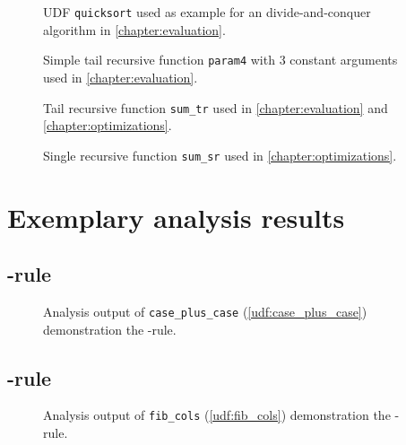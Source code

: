 \begin{figure}[h!]
    \centering
    \caption{UDF \texttt{quicksort} used as example for an divide-and-conquer algorithm in \autoref{chapter:evaluation}.}
    \label{udf:quicksort}
\end{figure}

\begin{figure}[h!]
    \centering
    
    \caption{Simple tail recursive function \texttt{param4} with 3 constant arguments used in \autoref{chapter:evaluation}.}
    \label{udf:param4}
\end{figure}

\begin{figure}[h!]
    \centering
    
    \caption{Tail recursive function \texttt{sum\_tr} used in \autoref{chapter:evaluation} and \autoref{chapter:optimizations}.}
    \label{udf:sum_tr}
\end{figure}

\begin{figure}[h!]
    \centering
    
    \caption{Single recursive function \texttt{sum\_sr} used in \autoref{chapter:optimizations}.}
    \label{udf:sum_sr}
\end{figure}

\FloatBarrier
{}
\section{Exemplary analysis results}\label{appendix:analyzes}
\subsection{{\normalfont\REXPR}-rule}

\begin{figure}[h!]
    \centering
    
    \caption{Analysis output of \texttt{case\_plus\_case} (\autoref{udf:case_plus_case}) demonstration the \REXPR-rule.}
    \label{scenarios:case_plus_case}
\end{figure}

\FloatBarrier
\newpage
\subsection{{\normalfont\RSELECT}-rule}

\begin{figure}[h!]
    \centering
    
    \caption{Analysis output of \texttt{fib\_cols} (\autoref{udf:fib_cols}) demonstration the \RSELECT-rule.}
    \label{scenarios:fib_cols}
\end{figure}
\restoregeometry


